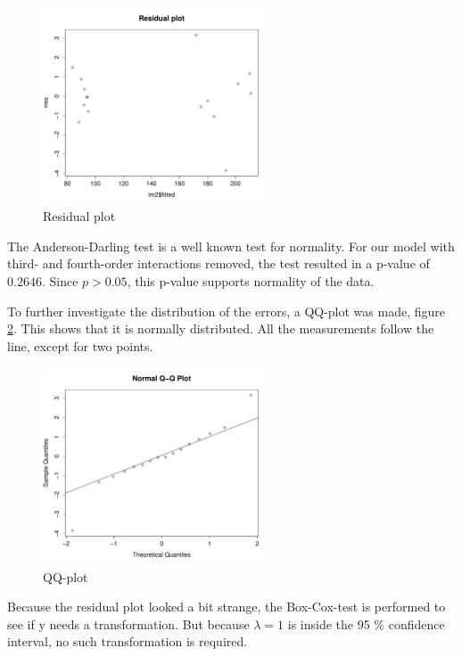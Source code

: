 \begin{figure}[H]
    \centering
    \includegraphics[width=0.6\textwidth]{PDF/residualPlot.pdf}
    \caption{Residual plot}
    \label{fig:residual}
\end{figure}

The Anderson-Darling test is a well known test for normality. For our model with third- and fourth-order interactions removed, the test resulted in a p-value of $0.2646$. Since $p > 0.05$, this p-value supports normality of the data.

To further investigate the distribution of the errors, a QQ-plot was made, figure \ref{fig:qqPlot}. This shows that it is normally distributed. All the measurements follow the line, except for two points.

\begin{figure}[H]
    \centering
    \includegraphics[width=0.6\textwidth]{PDF/qqPlot.pdf}
    \caption{QQ-plot}
    \label{fig:qqPlot}
\end{figure}

Because the residual plot looked a bit strange, the Box-Cox-test is performed to see if y needs a transformation. But because $\lambda = 1$ is inside the 95 $\%$ confidence interval, no such transformation is required. 

